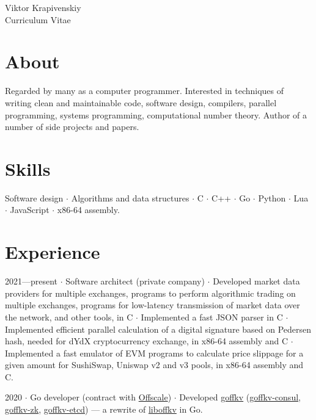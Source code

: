 \documentclass[10pt]{article}
\begin{document}
\parbox[top][0.12\textheight][c]{\linewidth}{
    \vspace{-0.04\textheight}
    \centering
    {\sffamily\Huge Viktor Krapivenskiy}\\\medskip
    {\Huge Curriculum Vitae}
}

\medskip

\section{About}

Regarded by many as a computer programmer.
Interested in
  techniques of writing clean and maintainable code,
  software design,
  compilers,
  parallel programming,
  systems programming,
  computational number theory.
Author of a number of side projects and papers.

\medskip

\section{Skills}

Software design $\cdot$
Algorithms and data structures $\cdot$
C $\cdot$
C++ $\cdot$
Go $\cdot$
Python $\cdot$
Lua $\cdot$
JavaScript $\cdot$
x86-64 assembly.

\medskip

\section{Experience}

2021---present $\cdot$ Software architect (private company) $\cdot$ Developed market data providers for multiple exchanges, programs to perform algorithmic trading on multiple exchanges, programs for low-latency transmission of market data over the network, and other tools, in C $\cdot$ Implemented a fast JSON parser in C $\cdot$ Implemented efficient parallel calculation of a digital signature based on Pedersen hash, needed for dYdX cryptocurrency exchange, in x86-64 assembly and C $\cdot$ Implemented a fast emulator of EVM programs to calculate price slippage for a given amount for SushiSwap, Uniswap v2 and v3 pools, in x86-64 assembly and C.

\medskip

2020 $\cdot$ Go developer (contract with \href{https://offscale.io}{Offscale}) $\cdot$ Developed \href{https://github.com/offscale/goffkv}{goffkv} (\href{https://github.com/offscale/goffkv-consul}{goffkv-consul}, \href{https://github.com/offscale/goffkv-zk}{goffkv-zk}, \href{https://github.com/offscale/goffkv-etcd}{goffkv-etcd}) --- a rewrite of \href{https://github.com/offscale/liboffkv}{liboffkv} in Go.
\end{document}
